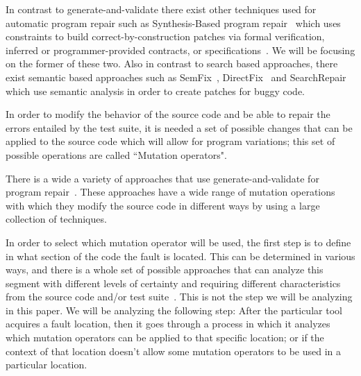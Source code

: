 \documentclass[conference]{IEEEtran}
\newcommand{\todo}[1]
  {{\scriptsize \textbf{\color{red} {#1}}}}
\begin{document}
  
 In contrast to generate-and-validate there exist other techniques used for 
automatic program repair such as Synthesis-Based program 
repair~\cite{jin11,pei14} which uses constraints to build 
correct-by-construction patches via formal verification, inferred or 
programmer-provided contracts,
or specifications~\cite{smith15}. We will be focusing on the former of these 
two. Also in contrast to search based approaches, there exist semantic based approaches such as SemFix~\cite{nguyen13}, DirectFix~\cite{mechtaev15} and SearchRepair~\cite{ke15} which use semantic analysis in order to create patches for buggy code.


In order to modify the behavior of the source code and be able to repair the 
errors entailed by the test suite, it is needed a set of possible changes that 
can be applied to the source code which will allow for program variations; this 
set of possible operations are called ``Mutation operators". 

There is a wide a variety of approaches that use generate-and-validate for 
program 
repair~\cite{legoues12,kim2013,Weimer13,fan15,long15,debroy10,perkins09,wei10}. 
These approaches 
have a wide range of mutation operations with which they modify the source code 
in different ways by using a large collection of techniques. 

In
order to select which mutation operator will be used, the 
first step is to define in what section of the code the fault is located. This can be determined in various ways, and 
there is 
a whole set of
possible approaches that can analyze this segment with different levels of certainty and 
requiring different characteristics from the source code and/or test 
suite~\cite{Jones05,Jones02,Chen02,legoues12,Qi13,Qi2013,Abreu07,wong09}. This is not the 
step we will be analyzing in this
paper. We will be analyzing the following step: After the particular tool 
acquires a fault location, then
it goes through a process in which it analyzes which mutation operators can
be applied to that specific location; or if the context of that location doesn't
allow some mutation operators to be used in a particular location. 
\end{document}
